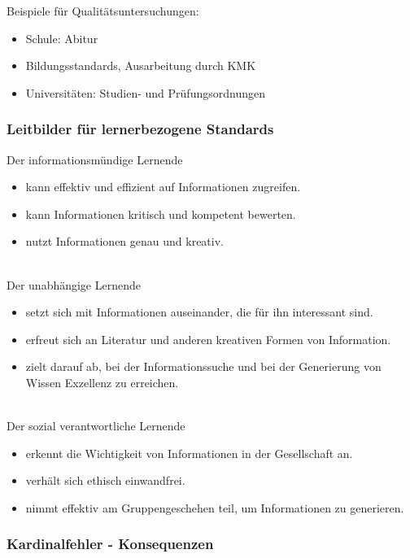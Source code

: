 \documentclass[a4paper]{article}
\begin{document}
Beispiele für Qualitätsuntersuchungen:
\begin{itemize}
	\item Schule: Abitur
	\item Bildungsstandards, Ausarbeitung durch KMK
	\item Universitäten: Studien- und Prüfungsordnungen
\end{itemize}

\subsubsection{Leitbilder für lernerbezogene Standards}

Der informationsmündige Lernende
\begin{itemize}
	\item kann effektiv und effizient auf Informationen zugreifen.
	\item kann Informationen kritisch und kompetent bewerten.
	\item nutzt Informationen genau und kreativ.
\end{itemize}
~\\
Der unabhängige Lernende
\begin{itemize}
	\item setzt sich mit Informationen auseinander, die für ihn interessant sind.
	\item erfreut sich an Literatur und anderen kreativen Formen von Information.
	\item zielt darauf ab, bei der Informationssuche und bei der Generierung von
	Wissen Exzellenz zu erreichen.
\end{itemize}
~\\
Der sozial verantwortliche Lernende
\begin{itemize}
	\item erkennt die Wichtigkeit von Informationen in der Gesellschaft an.
	\item verhält sich ethisch einwandfrei.
	\item nimmt effektiv am Gruppengeschehen teil, um Informationen zu
	generieren.
\end{itemize}

\subsubsection{Kardinalfehler - Konsequenzen}
\end{document}
